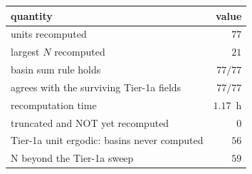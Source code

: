 \begin{tabular}{lr}
\hline
quantity & value \\
\hline
units recomputed & $77$ \\
largest $N$ recomputed & $21$ \\
basin sum rule holds & $77/77$ \\
agrees with the surviving Tier-1a fields & $77/77$ \\
recomputation time & $1.17$~h \\
\hline
truncated and NOT yet recomputed & $0$ \\
Tier-1a unit ergodic: basins never computed & $56$ \\
N beyond the Tier-1a sweep & $59$ \\
\hline
\end{tabular}
